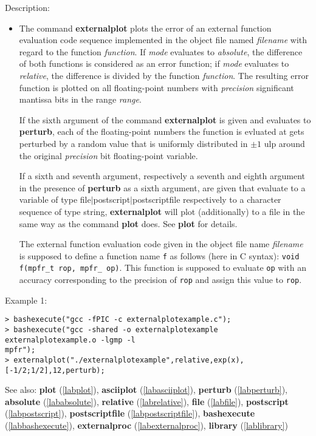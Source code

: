 \noindent Description: \begin{itemize}

\item The command \textbf{externalplot} plots the error of an external function
   evaluation code sequence implemented in the object file named
   \emph{filename} with regard to the function \emph{function}.  If \emph{mode}
   evaluates to \emph{absolute}, the difference of both functions is
   considered as an error function; if \emph{mode} evaluates to \emph{relative},
   the difference is divided by the function \emph{function}. The resulting
   error function is plotted on all floating-point numbers with
   \emph{precision} significant mantissa bits in the range \emph{range}. 
    
   If the sixth argument of the command \textbf{externalplot} is given and evaluates to
   \textbf{perturb}, each of the floating-point numbers the function is evluated at gets perturbed by a
   random value that is uniformly distributed in $\pm1$ ulp
   around the original \emph{precision} bit floating-point variable.
    
   If a sixth and seventh argument, respectively a seventh and eighth
   argument in the presence of \textbf{perturb} as a sixth argument, are given
   that evaluate to a variable of type \textsf{file$|$postscript$|$postscriptfile} respectively to a
   character sequence of type \textsf{string}, \textbf{externalplot} will plot
   (additionally) to a file in the same way as the command \textbf{plot}
   does. See \textbf{plot} for details.
    
   The external function evaluation code given in the object file name
   \emph{filename} is supposed to define a function name \texttt{f} as
   follows (here in C syntax): \texttt{void f(mpfr\_t rop, mpfr\_ op)}. 
   This function is supposed to evaluate \texttt{op} with an accuracy corresponding
   to the precision of \texttt{rop} and assign this value to
   \texttt{rop}.
\end{itemize}
\noindent Example 1: 
\begin{center}\begin{minipage}{15cm}\begin{Verbatim}[frame=single]
> bashexecute("gcc -fPIC -c externalplotexample.c");
> bashexecute("gcc -shared -o externalplotexample externalplotexample.o -lgmp -l
mpfr");
> externalplot("./externalplotexample",relative,exp(x),[-1/2;1/2],12,perturb);
\end{Verbatim}
\end{minipage}\end{center}
See also: \textbf{plot} (\ref{labplot}), \textbf{asciiplot} (\ref{labasciiplot}), \textbf{perturb} (\ref{labperturb}), \textbf{absolute} (\ref{lababsolute}), \textbf{relative} (\ref{labrelative}), \textbf{file} (\ref{labfile}), \textbf{postscript} (\ref{labpostscript}), \textbf{postscriptfile} (\ref{labpostscriptfile}), \textbf{bashexecute} (\ref{labbashexecute}), \textbf{externalproc} (\ref{labexternalproc}), \textbf{library} (\ref{lablibrary})
